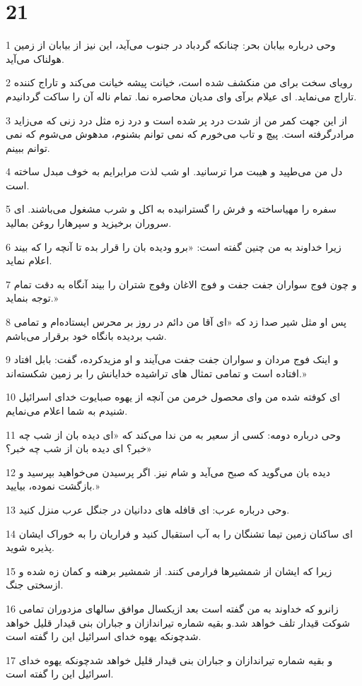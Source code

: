 \chapter{21}

\par 1 وحی درباره بیابان بحر: چنانکه گردباد در جنوب می‌آید، این نیز از بیابان از زمین هولناک می‌آید.
\par 2 رویای سخت برای من منکشف شده است، خیانت پیشه خیانت می‌کند و تاراج کننده تاراج می‌نماید. ای عیلام برآی و‌ای مدیان محاصره نما. تمام ناله آن را ساکت گردانیدم.
\par 3 از این جهت کمر من از شدت درد پر شده است و درد زه مثل درد زنی که می‌زاید مرادرگرفته است. پیچ و تاب می‌خورم که نمی توانم بشنوم، مدهوش می‌شوم که نمی توانم ببینم.
\par 4 دل من می‌طپید و هیبت مرا ترسانید. او شب لذت مرابرایم به خوف مبدل ساخته است.
\par 5 سفره را مهیاساخته و فرش را گسترانیده به اکل و شرب مشغول می‌باشند. ای سروران برخیزید و سپرهارا روغن بمالید.
\par 6 زیرا خداوند به من چنین گفته است: «برو ودیده بان را قرار بده تا آنچه را که بیند اعلام نماید.
\par 7 و چون فوج سواران جفت جفت و فوج الاغان وفوج شتران را بیند آنگاه به دقت تمام توجه بنماید.»
\par 8 پس او مثل شیر صدا زد که «ای آقا من دائم در روز بر محرس ایستاده‌ام و تمامی شب بردیده بانگاه خود برقرار می‌باشم.
\par 9 و اینک فوج مردان و سواران جفت جفت می‌آیند و او مزیدکرده، گفت: بابل افتاد افتاده است و تمامی تمثال های تراشیده خدایانش را بر زمین شکسته‌اند.»
\par 10 ‌ای کوفته شده من و‌ای محصول خرمن من آنچه از یهوه صبایوت خدای اسرائیل شنیدم به شما اعلام می‌نمایم.
\par 11 وحی درباره دومه: کسی از سعیر به من ندا می‌کند که «ای دیده بان از شب چه خبر؟ ای دیده بان از شب چه خبر؟»
\par 12 دیده بان می‌گوید که صبح می‌آید و شام نیز. اگر پرسیدن می‌خواهید بپرسید و بازگشت نموده، بیایید.»
\par 13 وحی درباره عرب: ای قافله های ددانیان در جنگل عرب منزل کنید.
\par 14 ‌ای ساکنان زمین تیما تشنگان را به آب استقبال کنید و فراریان را به خوراک ایشان پذیره شوید.
\par 15 زیرا که ایشان از شمشیرها فرارمی کنند. از شمشیر برهنه و کمان زه شده و ازسختی جنگ.
\par 16 زانرو که خداوند به من گفته است بعد ازیکسال موافق سالهای مزدوران تمامی شوکت قیدار تلف خواهد شد.و بقیه شماره تیراندازان و جباران بنی قیدار قلیل خواهد شدچونکه یهوه خدای اسرائیل این را گفته است. 
\par 17 و بقیه شماره تیراندازان و جباران بنی قیدار قلیل خواهد شدچونکه یهوه خدای اسرائیل این را گفته است.
 
